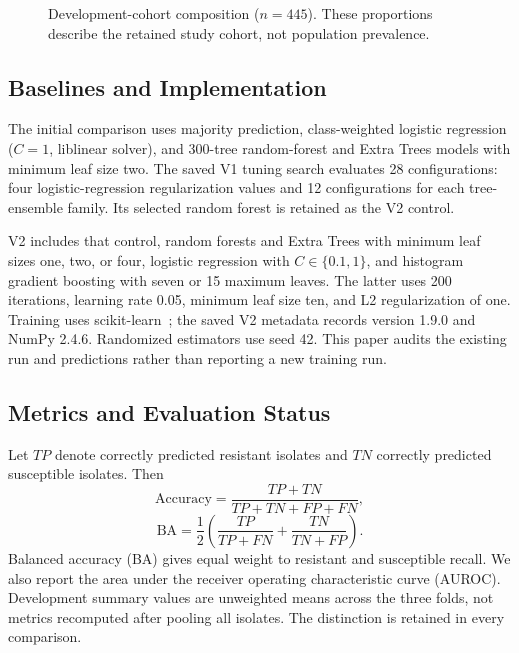\documentclass[conference]{IEEEtran}
\begin{document}
\begin{figure}[t]
\centering
{}
\caption{Development-cohort composition ($n=445$). These proportions describe the retained study cohort, not population prevalence.}
\label{fig:pie}
\end{figure}

\subsection{Baselines and Implementation}
The initial comparison uses majority prediction, class-weighted logistic regression ($C=1$, liblinear solver), and 300-tree random-forest and Extra Trees models with minimum leaf size two. The saved V1 tuning search evaluates 28 configurations: four logistic-regression regularization values and 12 configurations for each tree-ensemble family. Its selected random forest is retained as the V2 control.

V2 includes that control, random forests and Extra Trees with minimum leaf sizes one, two, or four, logistic regression with $C\in\{0.1,1\}$, and histogram gradient boosting with seven or 15 maximum leaves. The latter uses 200 iterations, learning rate 0.05, minimum leaf size ten, and L2 regularization of one. Training uses scikit-learn~\cite{sklearn}; the saved V2 metadata records version 1.9.0 and NumPy 2.4.6. Randomized estimators use seed 42. This paper audits the existing run and predictions rather than reporting a new training run.

\subsection{Metrics and Evaluation Status}
Let $TP$ denote correctly predicted resistant isolates and $TN$ correctly predicted susceptible isolates. Then
\begin{equation}
\mathrm{Accuracy}=\frac{TP+TN}{TP+TN+FP+FN},
\end{equation}
\begin{equation}
\mathrm{BA}=\frac{1}{2}\left(\frac{TP}{TP+FN}+\frac{TN}{TN+FP}\right).
\end{equation}
Balanced accuracy (BA) gives equal weight to resistant and susceptible recall. We also report the area under the receiver operating characteristic curve (AUROC). Development summary values are unweighted means across the three folds, not metrics recomputed after pooling all isolates. The distinction is retained in every comparison.
\end{document}
